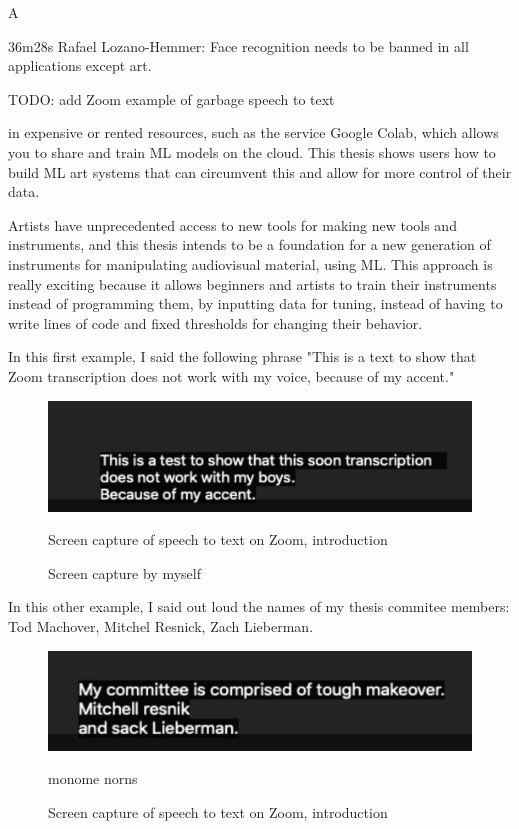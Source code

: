 A 

\cite{website-talk-technology-and-public-art-rafael-lozano-hemmer}
36m28s
Rafael Lozano-Hemmer: Face recognition needs to be banned in all applications except art.

TODO: add Zoom example of garbage speech to text


 in expensive or rented resources, such as the service Google Colab, which allows you to share and train ML models on the cloud. This thesis shows users how to build \acrshort{ML} art systems that can circumvent this and allow for more control of their data.

Artists have unprecedented access to new tools for making new tools and instruments, and this thesis intends to be a foundation for a new generation of instruments for manipulating audiovisual material, using \acrshort{ML}. This approach is really exciting because it allows beginners and artists to train their instruments instead of programming them, by inputting data for tuning, instead of having to write lines of code and fixed thresholds for changing their behavior.

In this first example, I said the following phrase "This is a text to show that Zoom transcription does not work with my voice, because of my accent."

\begin{figure}[ht]
  \centering
  \includegraphics[width=0.75\linewidth,height=0.25\textheight,keepaspectratio]{images/zoom-introduction.jpg}
  \caption{Screen capture of speech to text on Zoom, introduction}
  \caption*{Screen capture by myself}
  \label{fig:zoom-voice}
\end{figure}

In this other example, I said out loud the names of my thesis commitee members: Tod Machover, Mitchel Resnick, Zach Lieberman.

\begin{figure}[ht]
  \centering
  \includegraphics[width=0.75\linewidth,height=0.25\textheight,keepaspectratio]{images/zoom-commitee.jpg}
  \caption{monome norns}
  \caption*{Screen capture of speech to text on Zoom, introduction}
  \label{fig:zoom-committee}
\end{figure}

